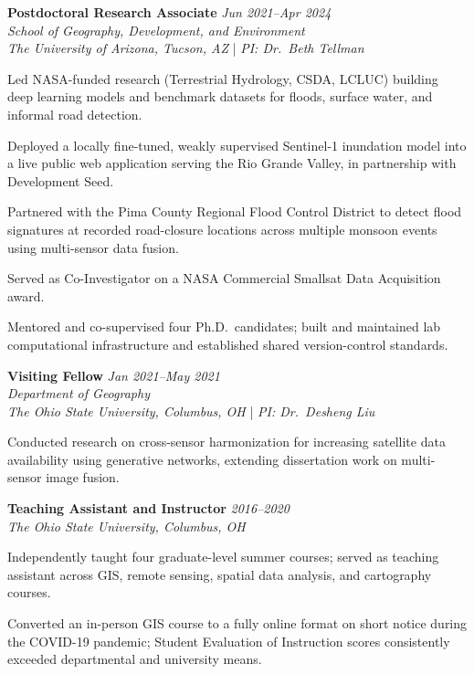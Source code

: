\documentclass[10pt,letterpaper]{article}
\begin{document}
\begin{entrylist}
  \item \textbf{Postdoctoral Research Associate} \hfill \textit{Jun 2021--Apr 2024}\\
  \emph{School of Geography, Development, and Environment}\\
  \emph{The University of Arizona, Tucson, AZ} \;|\; \emph{PI: Dr.\ Beth Tellman}
  \begin{subitems}
    \item Led NASA-funded research (Terrestrial Hydrology, CSDA, LCLUC) building deep learning models and benchmark datasets for floods, surface water, and informal road detection.
    \item Deployed a locally fine-tuned, weakly supervised Sentinel-1 inundation model into a live public web application serving the Rio Grande Valley, in partnership with Development Seed.
    \item Partnered with the Pima County Regional Flood Control District to detect flood signatures at recorded road-closure locations across multiple monsoon events using multi-sensor data fusion.
    \item Served as Co-Investigator on a NASA Commercial Smallsat Data Acquisition award.
    \item Mentored and co-supervised four Ph.D.\ candidates; built and maintained lab computational infrastructure and established shared version-control standards.
  \end{subitems}

  \item \textbf{Visiting Fellow} \hfill \textit{Jan 2021--May 2021}\\
  \emph{Department of Geography}\\
  \emph{The Ohio State University, Columbus, OH} \;|\; \emph{PI: Dr.\ Desheng Liu}
  \begin{subitems}
    \item Conducted research on cross-sensor harmonization for increasing satellite data availability using generative networks, extending dissertation work on multi-sensor image fusion.
  \end{subitems}

  \item \textbf{Teaching Assistant and Instructor} \hfill \textit{2016--2020}\\
  \emph{The Ohio State University, Columbus, OH}
  \begin{subitems}
    \item Independently taught four graduate-level summer courses; served as teaching assistant across GIS, remote sensing, spatial data analysis, and cartography courses.
    \item Converted an in-person GIS course to a fully online format on short notice during the COVID-19 pandemic; Student Evaluation of Instruction scores consistently exceeded departmental and university means.
  \end{subitems}


\end{entrylist}
\end{document}
